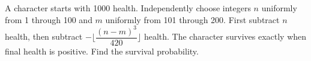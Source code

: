 A character starts with 1000 health. Independently choose integers $n$ uniformly from 1 through 100 and $m$ uniformly from 101 through 200. First subtract $n$ health, then subtract $-\lfloor\dfrac{(n-m)^3}{420}\rfloor$ health. The character survives exactly when final health is positive. Find the survival probability.
